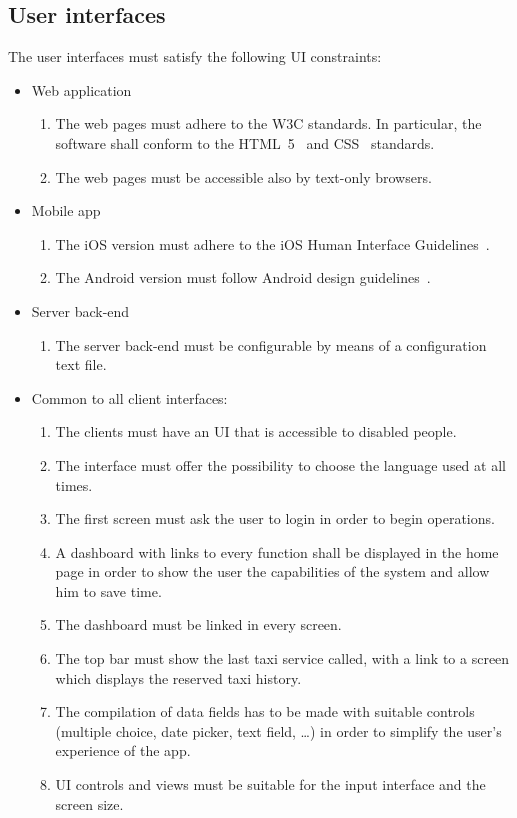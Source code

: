 \subsection{User interfaces}

The user interfaces must satisfy the following UI constraints:
\begin{itemize}
    \item Web application
        \begin{enumerate}
        \item The web pages must adhere to the W3C standards. In particular, the software shall conform to the HTML~5~\cite{w3c-html5} and CSS~\cite{w3c-css} standards.
        \item The web pages must be accessible also by text-only browsers.
        \end{enumerate}
    \item Mobile app
        \begin{enumerate}
        	\item The iOS version must adhere to the iOS Human Interface Guidelines~\cite{apple-ios-hig}.
	\item The Android version must follow Android design guidelines~\cite{google-android-hig}.
        \end{enumerate}
     \item Server back-end
     	\begin{enumerate}
		\item The server back-end must be configurable by means of a configuration text file.
	\end{enumerate}
    \item Common to all client interfaces:
    \begin{enumerate}
        \item The clients must have an UI that is accessible to disabled people.
        \item The interface must offer the possibility to choose the language used at all times.
        \item The first screen must ask the user to login in order to begin operations.
        \item A dashboard with links to every function shall be displayed in the home page in order to show the user the capabilities of the system and allow him to save time.
        \item The dashboard must be linked in every screen.
        \item The top bar must show the last taxi service called, with a link to a screen which displays the reserved taxi history.
        \item The compilation of data fields has to be made with suitable controls (multiple choice, date picker, text field, \ldots) in order to simplify the user's experience of the app.
        \item UI controls and views must be suitable for the input interface and the screen size.
    \end{enumerate}
\end{itemize}

